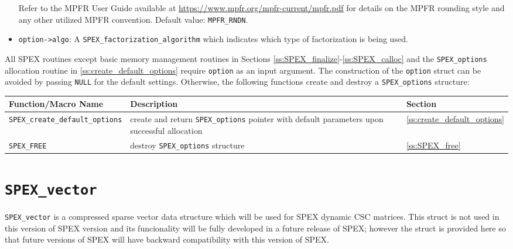\documentclass[12pt,oneside]{book}
\theoremstyle{definition}
\newenvironment{SizedCenteredTabular}[2][\small]
    {   
        #1\begin{center}\begin{tabular}{#2}
    }{ 
        \end{tabular}\end{center}
    }
\begin{document}
\begin{itemize}
    \noindent Refer to the MPFR User Guide available at \url{https://www.mpfr.org/mpfr-current/mpfr.pdf} for details on the MPFR rounding style and any other utilized MPFR convention. Default value: \verb|MPFR_RNDN|.

    \item \verb|option->algo|: A \verb|SPEX_factorization_algorithm| which indicates which type of factorization is being used.
\end{itemize}

All SPEX routines except basic memory management routines in Sections \ref{ss:SPEX_finalize}-\ref{ss:SPEX_calloc} and the \verb|SPEX_options| allocation routine in \ref{ss:create_default_options} require \verb|option| as an input argument.  The construction of the \verb|option| struct can be avoided by passing \verb|NULL| for the default settings.  Otherwise, the following functions create and destroy a \verb|SPEX_options| structure:

\begin{SizedCenteredTabular}{lp{2.5in}l} \hline
    Function/Macro Name & Description & Section \\ \hline
    \verb|SPEX_create_default_options|  
        & create and return \verb|SPEX_options| pointer with default parameters upon successful allocation
        & \ref{ss:create_default_options} \\ \hline
    \verb|SPEX_FREE|
        & destroy \verb|SPEX_options| structure
        & \ref{ss:SPEX_free} \\ \hline
\end{SizedCenteredTabular}


\section{\texttt{SPEX\_vector}} \label{ss:SPEX_vector}
\verb'SPEX_vector' is a compressed sparse vector data structure which will be used for SPEX dynamic CSC matrices. This struct is not used in this version of SPEX version and its funcionality will be fully developed in a future release of SPEX; however the struct is provided here so that future versions of SPEX will have backward compatibility with this version of SPEX.
\end{document}
